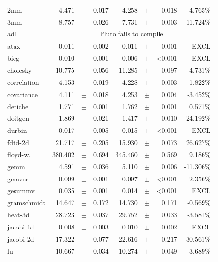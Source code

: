 \documentclass[sigplan]{acmart}
\begin{document}
\begin{table}
{\begin{center}
\begin{tabular}{p{1.2cm}rp{0.08cm}rrp{0.08cm}rr}
2mm           & 4.471  & $\pm$ & 0.017 & 4.258  & $\pm$ & 0.018 & 4.765\% \\
3mm           & 8.757  & $\pm$ & 0.026 & 7.731  & $\pm$ & 0.003 & 11.724\% \\
\rowcolor{aluminium1}
adi           & \multicolumn{7}{c}{Pluto fails to compile} \\
atax          & 0.011  & $\pm$ & 0.002 & 0.011  & $\pm$ & 0.001 & EXCL      \\
\rowcolor{aluminium1}
bicg          & 0.010  & $\pm$ & 0.001 & 0.006  & $\pm$ &<0.001 & EXCL      \\
cholesky      & 10.775 & $\pm$ & 0.056 & 11.285 & $\pm$ & 0.097 & -4.731\%  \\
\rowcolor{aluminium1}
correlation   & 4.153  & $\pm$ & 0.019 & 4.228  & $\pm$ & 0.003 & -1.822\%  \\
covariance    & 4.111  & $\pm$ & 0.018 & 4.253  & $\pm$ & 0.004 & -3.452\%  \\
\rowcolor{aluminium1}
deriche       & 1.771  & $\pm$ & 0.001 & 1.762  & $\pm$ & 0.001 & 0.571\%   \\
doitgen       & 1.869  & $\pm$ & 0.021 & 1.417  & $\pm$ & 0.010 & 24.192\%  \\
\rowcolor{aluminium1}
durbin        & 0.017  & $\pm$ & 0.005 & 0.015  & $\pm$ &<0.001 & EXCL      \\
fdtd-2d       & 21.717 & $\pm$ & 0.205 & 15.930 & $\pm$ & 0.073 & 26.627\%  \\
\rowcolor{aluminium1}
floyd-w.      & 380.402& $\pm$ & 0.694 & 345.460& $\pm$ & 0.569 & 9.186\%   \\
gemm          & 4.591  & $\pm$ & 0.036 & 5.110  & $\pm$ & 0.006 & -11.306\% \\
\rowcolor{aluminium1}
gemver        & 0.099  & $\pm$ & 0.001 & 0.097  & $\pm$ &<0.001 & 2.356\%   \\
gesummv       & 0.035  & $\pm$ & 0.001 & 0.014  & $\pm$ &<0.001 & EXCL      \\
\rowcolor{aluminium1}
gramschmidt   & 14.647 & $\pm$ & 0.172 & 14.730 & $\pm$ & 0.171 & -0.569\%  \\
heat-3d       & 28.723 & $\pm$ & 0.037 & 29.752 & $\pm$ & 0.033 & -3.581\%  \\
\rowcolor{aluminium1}
jacobi-1d     & 0.008  & $\pm$ & 0.003 & 0.010  & $\pm$ & 0.002 & EXCL      \\
jacobi-2d     & 17.322 & $\pm$ & 0.077 & 22.616 & $\pm$ & 0.217 & -30.561\% \\
\rowcolor{aluminium1}
lu            & 10.667 & $\pm$ & 0.034 & 10.274 & $\pm$ & 0.049 & 3.689\%   \\

\end{tabular}
\end{center}}
\end{table}
\end{document}

